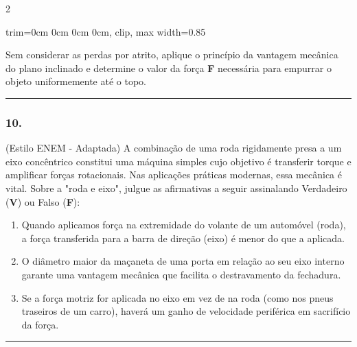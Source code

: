 \documentclass[twoside, 10pt, a4paper]{article}
\newlength{\espacoPreQuestao}
\newlength{\espacoQuestao}
\newlength{\espacoAlt}
\newcommand{\larguraTikz}{0.85\linewidth} %
\begin{document}
\begin{multicols*}{2}
\begin{center}
\begin{adjustbox}{trim=0cm 0cm 0cm 0cm, clip, max width=\larguraTikz}
\end{adjustbox}
\end{center}
Sem considerar as perdas por atrito, aplique o princípio da vantagem mecânica do plano inclinado e determine o valor da força \textbf{F} necessária para empurrar o objeto uniformemente até o topo.
\par\vspace{\espacoQuestao}

\noindent\textcolor{CorLinha}{\rule{\linewidth}{0.5pt}} 
\par\vspace{\espacoPreQuestao}
\subsubsection*{10.} (Estilo ENEM - Adaptada) A combinação de uma roda rigidamente presa a um eixo concêntrico constitui uma máquina simples cujo objetivo é transferir torque e amplificar forças rotacionais. Nas aplicações práticas modernas, essa mecânica é vital. Sobre a "roda e eixo", julgue as afirmativas a seguir assinalando Verdadeiro (\textbf{V}) ou Falso (\textbf{F}):
\begin{enumerate}[label=\Roman*., itemsep=\espacoAlt]
    \item Quando aplicamos força na extremidade do volante de um automóvel (roda), a força transferida para a barra de direção (eixo) é menor do que a aplicada.
    \item O diâmetro maior da maçaneta de uma porta em relação ao seu eixo interno garante uma vantagem mecânica que facilita o destravamento da fechadura.
    \item Se a força motriz for aplicada no eixo em vez de na roda (como nos pneus traseiros de um carro), haverá um ganho de velocidade periférica em sacrifício da força.
\end{enumerate}
\par\vspace{\espacoQuestao}

\noindent\textcolor{CorLinha}{\rule{\linewidth}{0.5pt}} 
\par\vspace{\espacoPreQuestao}

\end{multicols*}
\end{document}
